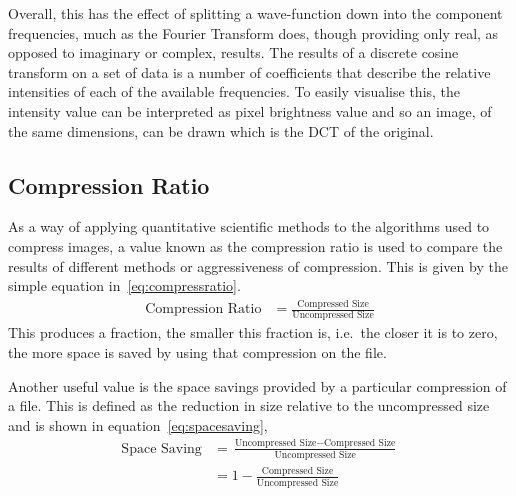 		Overall, this has the effect of splitting a wave-function down into the component frequencies, much as the Fourier Transform does, though providing only real, as opposed to imaginary or complex, results. The results of a discrete cosine transform on a set of data is a number of coefficients that describe the relative intensities of each of the available frequencies. To easily visualise this, the intensity value can be interpreted as pixel brightness value and so an image, of the same dimensions, can be drawn which is the DCT of the original.

	\subsection{Compression Ratio} %
		\label{sub:compression_ratio}
		As a way of applying quantitative scientific methods to the algorithms used to compress images, a value known as the compression ratio is used to compare the results of different methods or aggressiveness of compression. This is given by the simple equation in~\ref{eq:compressratio}.
		\begin{align}
			\text{Compression Ratio} &= \frac{\text{Compressed Size}}{\text{Uncompressed Size}} \label{eq:compressratio}
		\end{align}
		This produces a fraction, the smaller this fraction is, i.e.\ the closer it is to zero, the more space is saved by using that compression on the file.

		Another useful value is the space savings provided by a particular compression of a file. This is defined as the reduction in size relative to the uncompressed size and is shown in equation~\ref{eq:spacesaving},
		\begin{align}
			\text{Space Saving} &= \frac{\text{Uncompressed Size} - \text{Compressed Size}}{\text{Uncompressed Size}} \\
			 &= 1- \frac{\text{Compressed Size}}{\text{Uncompressed Size}} \label{eq:spacesaving}
		\end{align}

